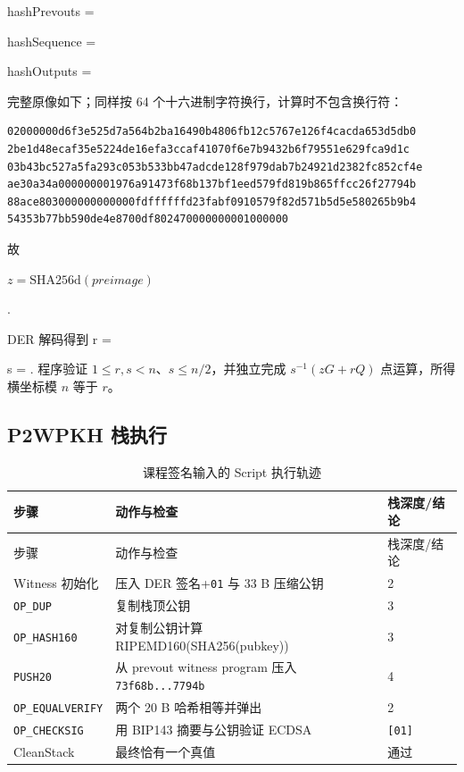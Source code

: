 \documentclass[UTF8,a4paper,zihao=-4]{ctexart}
\begin{document}
\begingroup\small\ttfamily
hashPrevouts = \par
hashSequence = \par
hashOutputs = 
\endgroup

完整原像如下；同样按 64 个十六进制字符换行，计算时不包含换行符：
\begin{lstlisting}[style=datastyle]
02000000d6f3e525d7a564b2ba16490b4806fb12c5767e126f4cacda653d5db0
2be1d48ecaf35e5224de16efa3ccaf41070f6e7b9432b6f79551e629fca9d1c
03b43bc527a5fa293c053b533bb47adcde128f979dab7b24921d2382fc852cf4e
ae30a34a000000001976a91473f68b137bf1eed579fd819b865ffcc26f27794b
88ace803000000000000fdffffffd23fabf0910579f82d571b5d5e580265b9b4
54353b77bb590de4e8700df802470000000001000000
\end{lstlisting}
故
\begin{center}
$z=\mathrm{SHA256d}(preimage)$\par
\small\ttfamily{}.
\end{center}
DER 解码得到
\begingroup\small\ttfamily
r = \par
s = .
\endgroup
程序验证 $1\le r,s<n$、$s\le n/2$，并独立完成 $s^{-1}(zG+rQ)$ 点运算，所得横坐标模 $n$ 等于 $r$。

\subsection{P2WPKH 栈执行}

\begin{longtable}{p{}>{\raggedright\arraybackslash}p{}p{}}
\caption{课程签名输入的 Script 执行轨迹}\label{tab:script-trace}\\
\toprule
步骤 & 动作与检查 & 栈深度/结论\\
\midrule
\endfirsthead
\toprule
步骤 & 动作与检查 & 栈深度/结论\\
\midrule
\endhead
Witness 初始化 & 压入 DER 签名+\texttt{01} 与 33 B 压缩公钥 & 2\\
\texttt{OP\_DUP} & 复制栈顶公钥 & 3\\
\texttt{OP\_HASH160} & 对复制公钥计算 RIPEMD160(SHA256(pubkey)) & 3\\
\texttt{PUSH20} & 从 prevout witness program 压入 \texttt{73f68b...7794b} & 4\\
\texttt{OP\_EQUALVERIFY} & 两个 20 B 哈希相等并弹出 & 2\\
\texttt{OP\_CHECKSIG} & 用 BIP143 摘要与公钥验证 ECDSA & \texttt{[01]}\\
CleanStack & 最终恰有一个真值 & 通过\\
\bottomrule
\end{longtable}
\end{document}
